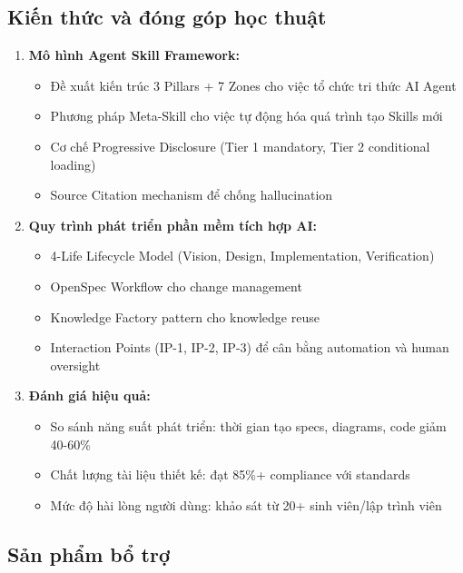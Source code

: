 \documentclass[13pt,a4paper,oneside]{extreport}
\numberwithin{equation}{chapter}
\numberwithin{figure}{chapter}
\numberwithin{table}{chapter}
\begin{document}
\subsection*{Kiến thức và đóng góp học thuật}

\begin{enumerate}
    \item \textbf{Mô hình Agent Skill Framework:}
    \begin{itemize}
        \item Đề xuất kiến trúc 3 Pillars + 7 Zones cho việc tổ chức tri thức AI Agent
        \item Phương pháp Meta-Skill cho việc tự động hóa quá trình tạo Skills mới
        \item Cơ chế Progressive Disclosure (Tier 1 mandatory, Tier 2 conditional loading)
        \item Source Citation mechanism để chống hallucination
    \end{itemize}

    \item \textbf{Quy trình phát triển phần mềm tích hợp AI:}
    \begin{itemize}
        \item 4-Life Lifecycle Model (Vision, Design, Implementation, Verification)
        \item OpenSpec Workflow cho change management
        \item Knowledge Factory pattern cho knowledge reuse
        \item Interaction Points (IP-1, IP-2, IP-3) để cân bằng automation và human oversight
    \end{itemize}

    \item \textbf{Đánh giá hiệu quả:}
    \begin{itemize}
        \item So sánh năng suất phát triển: thời gian tạo specs, diagrams, code giảm 40-60\%
        \item Chất lượng tài liệu thiết kế: đạt 85\%+ compliance với standards
        \item Mức độ hài lòng người dùng: khảo sát từ 20+ sinh viên/lập trình viên
    \end{itemize}
\end{enumerate}

\subsection*{Sản phẩm bổ trợ}
\end{document}
